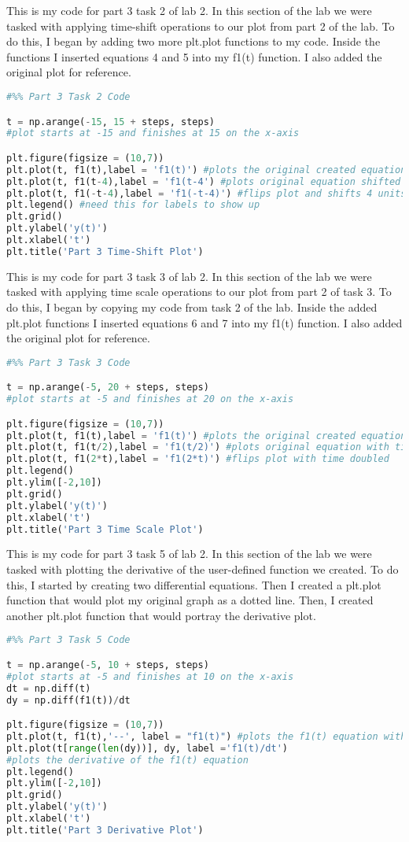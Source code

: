 \documentclass[12pt]{report}
\begin{document}
{This is my code for part 3 task 2 of lab 2. In this section of the lab we were tasked with applying time-shift operations to our plot from part 2 of the lab. To do this, I began by adding two more plt.plot functions to my code. Inside the functions I inserted equations 4 and 5 into my f1(t) function. I also added the original plot for reference. }
\begin{lstlisting}[language=Python]
#%% Part 3 Task 2 Code

t = np.arange(-15, 15 + steps, steps) 
#plot starts at -15 and finishes at 15 on the x-axis

plt.figure(figsize = (10,7))
plt.plot(t, f1(t),label = 'f1(t)') #plots the original created equation
plt.plot(t, f1(t-4),label = 'f1(t-4') #plots original equation shifted 4 units to the right
plt.plot(t, f1(-t-4),label = 'f1(-t-4)') #flips plot and shifts 4 units to the left
plt.legend() #need this for labels to show up
plt.grid()
plt.ylabel('y(t)')
plt.xlabel('t')
plt.title('Part 3 Time-Shift Plot')
\end{lstlisting}

{This is my code for part 3 task 3 of lab 2. In this section of the lab we were tasked with applying time scale operations to our plot from part 2 of task 3. To do this, I began by copying my code from task 2 of the lab. Inside the added plt.plot functions I inserted equations 6 and 7 into my f1(t) function. I also added the original plot for reference. }
\begin{lstlisting}[language=Python]
#%% Part 3 Task 3 Code

t = np.arange(-5, 20 + steps, steps) 
#plot starts at -5 and finishes at 20 on the x-axis

plt.figure(figsize = (10,7))
plt.plot(t, f1(t),label = 'f1(t)') #plots the original created equation
plt.plot(t, f1(t/2),label = 'f1(t/2)') #plots original equation with time halved
plt.plot(t, f1(2*t),label = 'f1(2*t)') #flips plot with time doubled
plt.legend()
plt.ylim([-2,10])
plt.grid()
plt.ylabel('y(t)')
plt.xlabel('t')
plt.title('Part 3 Time Scale Plot')
\end{lstlisting}

{This is my code for part 3 task 5 of lab 2. In this section of the lab we were tasked with plotting the derivative of the user-defined function we created. To do this, I started by creating two differential equations. Then I created a plt.plot function that would plot my original graph as a dotted line. Then, I created another plt.plot function that would portray the derivative plot.  }
\begin{lstlisting}[language=Python]
#%% Part 3 Task 5 Code

t = np.arange(-5, 10 + steps, steps) 
#plot starts at -5 and finishes at 10 on the x-axis
dt = np.diff(t)
dy = np.diff(f1(t))/dt

plt.figure(figsize = (10,7))
plt.plot(t, f1(t),'--', label = "f1(t)") #plots the f1(t) equation with a dotted line
plt.plot(t[range(len(dy))], dy, label ='f1(t)/dt') 
#plots the derivative of the f1(t) equation
plt.legend()
plt.ylim([-2,10])
plt.grid()
plt.ylabel('y(t)')
plt.xlabel('t')
plt.title('Part 3 Derivative Plot')

\end{lstlisting}
\end{document}
